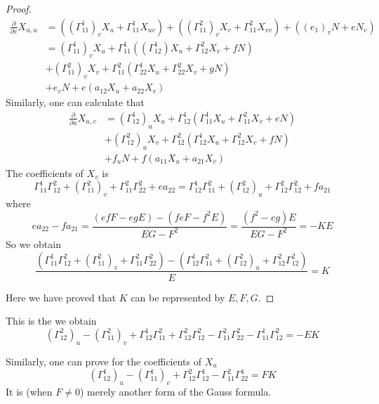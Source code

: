 \begin{proof}
    \begin{equation}
        \begin{aligned}
            \frac{\partial }{\partial v}X_{u,u}&=((\Gamma_{11}^1)_vX_u+\Gamma_{11}^1X_{uv})+((\Gamma_{11}^2)_vX_v+\Gamma_{11}^2X_{vv})+((e_1)_vN+eN_v)\\
            &=(\Gamma_{11}^1)_vX_u+\Gamma_{11}^1((\Gamma_{12}^1)X_u+\Gamma_{12}^2X_v+fN)\\
            &+(\Gamma_{11}^2)_vX_v+\Gamma_{11}^2(\Gamma_{22}^1X_u+\Gamma_{22}^2X_v+gN)\\
            &+e_vN+e(a_{12}X_u+a_{22}X_v)
        \end{aligned}
    \end{equation}
    Similarly, one can calculate that
    \begin{equation}
        \begin{aligned}
            \frac{\partial}{\partial u}X_{u,v}&=(\Gamma_{12}^1)_uX_u+\Gamma_{12}^1(\Gamma_{11}^1X_u+\Gamma_{11}^2X_v+eN)\\
            &+(\Gamma_{12}^2)_uX_v+\Gamma_{12}^2(\Gamma_{12}^1X_u+\Gamma_{12}^2X_v+fN)\\
            &+f_uN+f(a_{11}X_u+a_{21}X_v)
        \end{aligned}
    \end{equation}
    The coefficients of  $ X_v $ is 
    \[\Gamma_{11}^1\Gamma_{12}^2+(\Gamma_{11}^2)_v+\Gamma_{11}^2\Gamma_{22}^2+ea_{22}=\Gamma_{12}^1\Gamma_{11}^2+(\Gamma_{12}^2)_u+\Gamma_{12}^2\Gamma_{12}^2+fa_{21}\]
    where 
    \[ea_{22}-fa_{21}=\frac{(efF-egE)-(feF-f^2E)}{EG-F^2}=\frac{(f^2-eg)E}{EG-F^2}=-KE\]
    So we obtain
    \begin{equation}
        \frac{(\Gamma_{11}^1\Gamma_{12}^2+(\Gamma_{11}^2)_v+\Gamma_{11}^2\Gamma_{22}^2)-(\Gamma_{12}^1\Gamma_{11}^2+(\Gamma_{12}^2)_u+\Gamma_{12}^2\Gamma_{12}^2)}{E}=K
    \end{equation} 

    Here we have proved that  $ K  $ can be represented by  $ E,F,G $.
\end{proof}

This is the  we obtain 
\begin{equation}\label{Gauss equation 1}
    (\Gamma_{12}^2)_u-(\Gamma_{11}^2)_v+\Gamma_{12}^1\Gamma_{11}^2+\Gamma_{12}^2\Gamma_{12}^2-\Gamma_{11}^2\Gamma_{22}^2-\Gamma_{11}^1\Gamma_{12}^2=-EK
\end{equation}

Similarly, one can prove for the coefficients of  $ X_u $
    \begin{equation}\label{Gauss equation 2}
        (\Gamma_{12}^1)_u-(\Gamma_{11}^1)_v+\Gamma_{12}^2\Gamma_{12}^1-\Gamma_{11}^2\Gamma_{22}^1=FK
    \end{equation}
It is (when  $ F\neq 0 $) merely another form of the Gauss formula.

